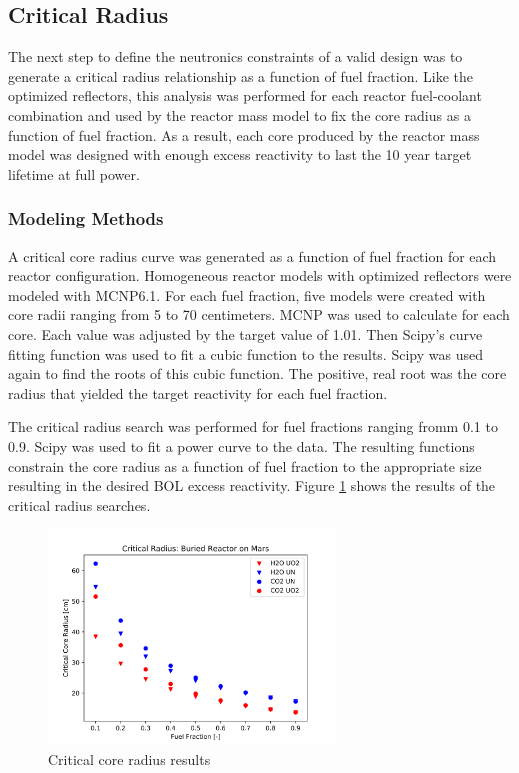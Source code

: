 \subsection{Critical Radius}
The next step to define the neutronics constraints of a valid design was to
generate a critical radius relationship as a function of fuel fraction. Like the
optimized reflectors, this analysis was performed for each reactor fuel-coolant
combination and used by the reactor mass model to fix the core radius as a
function of fuel fraction. As a result, each core produced by the reactor mass
model was designed with enough excess reactivity to last the 10 year target
lifetime at full power.

\subsubsection{Modeling Methods}
A critical core radius curve was generated as a function of fuel fraction for
each reactor configuration. Homogeneous reactor models with optimized reflectors
were modeled with MCNP6.1. For each fuel fraction, five models were created with
core radii ranging from 5 to 70 centimeters. MCNP was used to calculate \keff
for each core. Each value was adjusted by the target \keff value of 1.01. Then
Scipy's curve fitting function was used to fit a cubic function to the
results. Scipy was used again to find the roots of this cubic function. The
positive, real root was the core radius that yielded the target reactivity for
each fuel fraction.

The critical radius search was performed for fuel fractions ranging fromm 0.1 to
0.9. Scipy was used to fit a power curve to the data. The resulting functions
constrain the core radius as a function of fuel fraction to the appropriate size
resulting in the desired BOL excess reactivity. Figure
\ref{fig:crit_core_radius} shows the results of the critical radius searches.

\begin{figure}[h]
    \centering
    \includegraphics[width=3in]{../images/crit_radius.png}
\caption{Critical core radius results}
\label{fig:crit_core_radius}
\end{figure}

